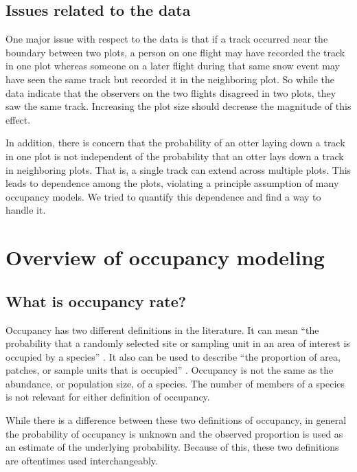 \documentclass[12pt]{article}
\begin{document}
    \subsection{Issues related to the data}
    One major issue with respect to the data is that if a track occurred near
    the boundary between two plots, a person on one flight may have recorded the
    track in one plot whereas someone on a later flight during that same snow
    event may have seen the same track but recorded it in the neighboring plot.
    So while the data indicate that the observers on the two flights disagreed
    in two plots, they saw the same track. Increasing the plot size should
    decrease the magnitude of this effect.

    In addition, there is concern that the probability of an otter laying down a
    track in one plot is not independent of the probability that an otter lays
    down a track in neighboring plots. That is, a single track can extend across
    multiple plots. This leads to dependence among the plots, violating a
    principle assumption of many
    occupancy models. We tried to quantify this
    dependence and find a way to handle it.

\section{Overview of occupancy modeling}

    \subsection{What is occupancy rate?}
    Occupancy has two different definitions in the literature. It can mean ``the
    probability that
    a randomly selected site or sampling unit in an area of interest is occupied
    by a species'' \cite{MacKenzie2006}. It also can be used to describe ``the
    proportion of area, patches, or sample units that is occupied''
    \cite{MacKenzie2006}. Occupancy is not the same as the abundance, or
    population size, of a species. The number of members of a species is not
    relevant for either definition of occupancy.

    While there is a difference between these two definitions of occupancy, in
    general the probability of occupancy is unknown and the observed proportion
    is used as an
    estimate of the underlying probability. Because of this, these two
    definitions are oftentimes used interchangeably.
\end{document}
